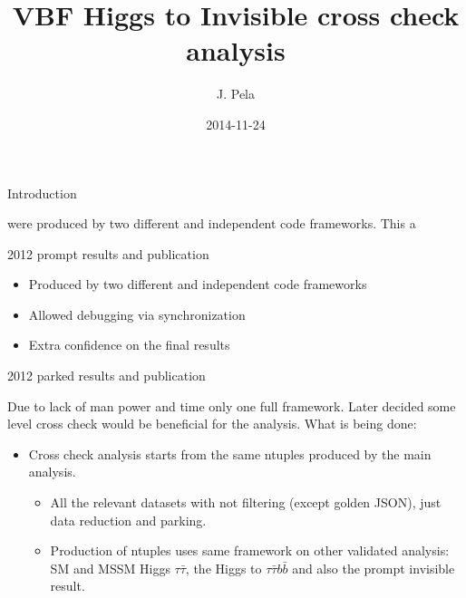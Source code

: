 \documentclass[8pt]{beamer}
\author[J. Pela]{J. Pela}
\title{VBF Higgs to Invisible cross check analysis}
\institute[ICL]{Imperial College London}
\date{2014-11-24}
\begin{document}
\setlength{\unitlength}{1mm}

\begin{frame}
  \titlepage
\end{frame}

\begin{frame}{Introduction}

 were produced by two different and independent code frameworks. This a

\begin{block}{2012 prompt results and publication}
 
 \begin{itemize}
  \item Produced by two different and independent code frameworks
  \item Allowed debugging via synchronization
  \item Extra confidence on the final results
 \end{itemize}

\end{block}

\begin{block}{2012 parked results and publication}
 
  Due to lack of man power and time only one full framework. Later decided some level cross check would be beneficial for the analysis. What is being done:
 
 \begin{itemize}
  \item Cross check analysis starts from the same ntuples produced by the main analysis.
  \begin{itemize}
    \item All the relevant datasets with not filtering (except golden JSON), just data reduction and parking.
    \item Production of ntuples uses same framework on other validated analysis: SM and MSSM Higgs $\tau\bar{\tau}$, the Higgs to $\tau\bar{\tau}b\bar{b}$ and also the prompt invisible result.
  \end{itemize}
  
 \end{itemize}
 
\end{block}

\end{frame}
\end{document}
